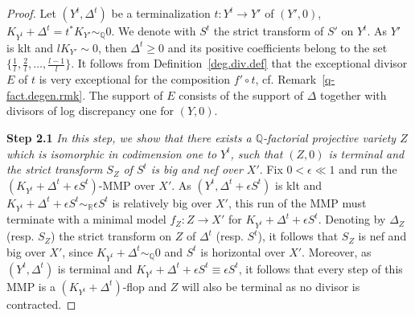 \documentclass[11pt]{ip-journal}
\theoremstyle{definition}
\newcommand{\bQ}{\mathbb{Q}}
\begin{document}
\begin{proof}
\medskip

Let $(Y^t, \Delta^t)$ be a terminalization $t \colon Y^t \to Y'$ of $(Y', 0)$, $K_{Y^t}+\Delta^t = t^\ast K_{Y'} \sim_\mathbb{Q} 0$.
We denote with $S^t$ the strict transform of $S'$ on $Y^t$.
As $Y'$ is klt and $lK_{Y'} \sim 0$, then $\Delta^t \geq 0$ and its positive coefficients belong to the set $\{\frac 1 l, \frac 2 l, \dots, \frac{l-1}{l}\}$.
It follows from Definition~\ref{deg.div.def} that the exceptional divisor $E$ of $t$ is very exceptional for the composition $f' \circ t$, cf. Remark~\ref{q-fact.degen.rmk}. 
The support of $E$ consists of the support of $\Delta$ together with divisors of log discrepancy one for $(Y, 0)$.

\medskip

{\bf Step 2.1} { \it In this step, we show that there exists a $\bQ$-factorial projective variety $Z$ which is isomorphic in codimension one to $Y^t$, such that $(Z, 0)$ is terminal and the strict transform $S_Z$ of $S^t$ is big and nef over $X'$}.
\newline
Fix $0 < \epsilon \ll 1$ and run the $(K_{Y^t} + \Delta^t + \epsilon S^t)$-MMP over $X'$. 
As $(Y^t, \Delta^t + \epsilon S^t)$ is klt and $K_{Y^t}+ \Delta^t + \epsilon S^t \sim_\mathbb{R}\epsilon S^t$ is relatively big over $X'$, this run of the MMP must terminate with a minimal model $f_Z \colon Z \to X'$ for $K_{Y^t} + \Delta^t + \epsilon S^t$.
Denoting by $\Delta_Z$ (resp. $S_Z$) the strict transform on $Z$ of $\Delta^t$ (resp. $S^t$), it follows that $S_Z$ is nef and big over $X'$, since $K_{Y^t}+\Delta^t \sim_\bQ 0$ and $S^t$ is horizontal over $X'$.
Moreover, as $(Y^t, \Delta^t)$ is terminal and $K_{Y^t} + \Delta^t + \epsilon S^t \equiv \epsilon S^t$, it follows that every step of this MMP is a $(K_{Y^t}+\Delta^t)$-flop and $Z$ will also be terminal as no divisor is contracted.


\end{proof}
\end{document}
